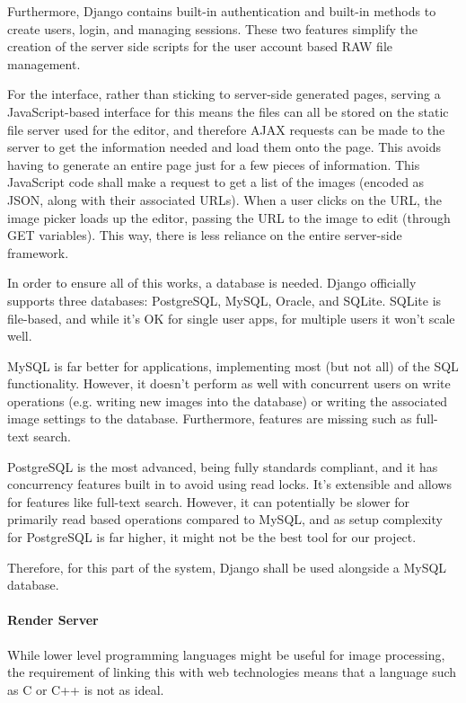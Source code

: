\documentclass[12pt,a4paper]{article}
\begin{document}
Furthermore, Django contains built-in authentication and built-in methods to create users,
login, and managing sessions. These two features simplify the creation of the server side scripts
for the user account based RAW file management.

For the interface, rather than sticking to server-side generated pages, serving a JavaScript-based
interface for this means the files can all be stored on the static file server used for the editor,
and therefore AJAX requests can be made to the server to get the information needed and load them
onto the page. This avoids having to generate an entire page just for a few pieces of information. This
JavaScript code shall make a request to get a list of the images (encoded as JSON, along with their associated
URLs). When a user clicks on the URL, the image picker loads up the editor, passing the URL to the image to edit (through
GET variables). This way, there is less reliance on the entire server-side framework.

In order to ensure all of this works, a database is needed. Django officially supports three databases:
PostgreSQL, MySQL, Oracle, and SQLite. SQLite is file-based, and while it's OK for single user apps, for multiple users it won't scale well.

MySQL is far better for applications, implementing most (but not all) of the SQL functionality. However,
it doesn't perform as well with concurrent users on write operations (e.g. writing new images into the database) or writing the associated image settings to the database. Furthermore, features are missing such as full-text search.

 PostgreSQL is the most advanced, being fully standards compliant, and it has concurrency features built in to avoid using read locks.
 It's extensible and allows for features like full-text search. However, it can potentially be slower for primarily read based operations
 compared to MySQL, and as setup complexity for PostgreSQL is far higher, it might not be the best tool for our project. \cite{ComparisonOfDatabaseBackends}

 Therefore, for this part of the system, Django shall be used alongside a MySQL database.
\paragraph{Render Server}
While lower level programming languages might be useful for image processing,
the requirement of linking this with web technologies means that a language such as C or C++ is not as ideal.
\end{document}
